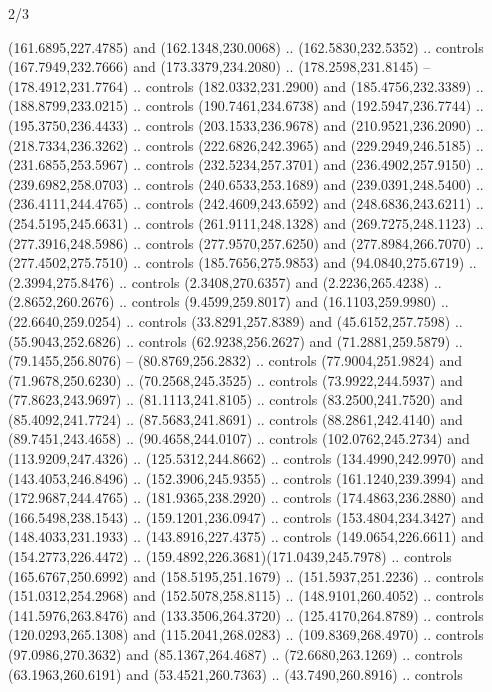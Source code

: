 \begin{flagdescription}{2/3}
\begin{scope}[yshift=\flagwidth,scale=\flagwidth/1241.93737]
\begin{scope}[y=-1mm, x=1mm,draw=gold,fill=blue,line join=miter,miter limit=4,line width=1.8\lw]
\begin{scope}[shift={(78,80)}]
  (161.6895,227.4785) and (162.1348,230.0068) .. (162.5830,232.5352) .. controls
  (167.7949,232.7666) and (173.3379,234.2080) .. (178.2598,231.8145) --
  (178.4912,231.7764) .. controls (182.0332,231.2900) and (185.4756,232.3389) ..
  (188.8799,233.0215) .. controls (190.7461,234.6738) and (192.5947,236.7744) ..
  (195.3750,236.4433) .. controls (203.1533,236.9678) and (210.9521,236.2090) ..
  (218.7334,236.3262) .. controls (222.6826,242.3965) and (229.2949,246.5185) ..
  (231.6855,253.5967) .. controls (232.5234,257.3701) and (236.4902,257.9150) ..
  (239.6982,258.0703) .. controls (240.6533,253.1689) and (239.0391,248.5400) ..
  (236.4111,244.4765) .. controls (242.4609,243.6592) and (248.6836,243.6211) ..
  (254.5195,245.6631) .. controls (261.9111,248.1328) and (269.7275,248.1123) ..
  (277.3916,248.5986) .. controls (277.9570,257.6250) and (277.8984,266.7070) ..
  (277.4502,275.7510) .. controls (185.7656,275.9853) and (94.0840,275.6719) ..
  (2.3994,275.8476) .. controls (2.3408,270.6357) and (2.2236,265.4238) ..
  (2.8652,260.2676) .. controls (9.4599,259.8017) and (16.1103,259.9980) ..
  (22.6640,259.0254) .. controls (33.8291,257.8389) and (45.6152,257.7598) ..
  (55.9043,252.6826) .. controls (62.9238,256.2627) and (71.2881,259.5879) ..
  (79.1455,256.8076) -- (80.8769,256.2832) .. controls (77.9004,251.9824) and
  (71.9678,250.6230) .. (70.2568,245.3525) .. controls (73.9922,244.5937) and
  (77.8623,243.9697) .. (81.1113,241.8105) .. controls (83.2500,241.7520) and
  (85.4092,241.7724) .. (87.5683,241.8691) .. controls (88.2861,242.4140) and
  (89.7451,243.4658) .. (90.4658,244.0107) .. controls (102.0762,245.2734) and
  (113.9209,247.4326) .. (125.5312,244.8662) .. controls (134.4990,242.9970) and
  (143.4053,246.8496) .. (152.3906,245.9355) .. controls (161.1240,239.3994) and
  (172.9687,244.4765) .. (181.9365,238.2920) .. controls (174.4863,236.2880) and
  (166.5498,238.1543) .. (159.1201,236.0947) .. controls (153.4804,234.3427) and
  (148.4033,231.1933) .. (143.8916,227.4375) .. controls (149.0654,226.6611) and
  (154.2773,226.4472) .. (159.4892,226.3681)(171.0439,245.7978) .. controls
  (165.6767,250.6992) and (158.5195,251.1679) .. (151.5937,251.2236) .. controls
  (151.0312,254.2968) and (152.5078,258.8115) .. (148.9101,260.4052) .. controls
  (141.5976,263.8476) and (133.3506,264.3720) .. (125.4170,264.8789) .. controls
  (120.0293,265.1308) and (115.2041,268.0283) .. (109.8369,268.4970) .. controls
  (97.0986,270.3632) and (85.1367,264.4687) .. (72.6680,263.1269) .. controls
  (63.1963,260.6191) and (53.4521,260.7363) .. (43.7490,260.8916) .. controls

\end{scope}
\end{scope}
\end{scope}
\end{flagdescription}
